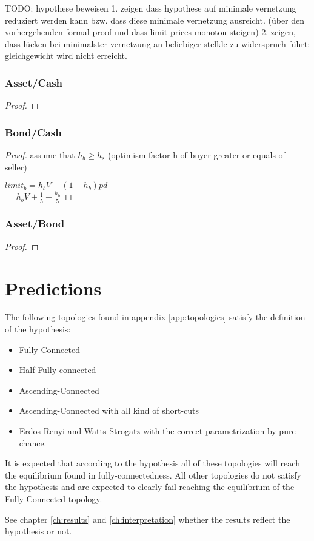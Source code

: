\documentclass[Bachelorarbeit.tex]{subfiles}
\begin{document}
TODO: hypothese beweisen
1. zeigen dass hypothese auf minimale vernetzung reduziert werden kann bzw. dass diese minimale vernetzung ausreicht. (über den vorhergehenden formal proof und dass limit-prices monoton steigen)
2. zeigen, dass lücken bei minimalster vernetzung an beliebiger stelkle zu widerspruch führt: gleichgewicht wird nicht erreicht. 


\subsubsection{Asset/Cash}
\begin{proof}
\end{proof}

\subsubsection{Bond/Cash}
\begin{proof}

assume that $h_b \geq h_s$ (optimism factor h of buyer greater or equals of seller)

$limit_b = h_b V + (1-h_b) pd$ \\
$= h_b V + \frac{1}{5} - \frac{h_b}{5}$
\end{proof}

\subsubsection{Asset/Bond}
\begin{proof}
\end{proof}

\section{Predictions}
The following topologies found in appendix \ref{app:topologies} satisfy the definition of the hypothesis:
 
\begin{itemize}
\item Fully-Connected
\item Half-Fully connected
\item Ascending-Connected
\item Ascending-Connected with all kind of short-cuts
\item Erdos-Renyi and Watts-Strogatz with the correct parametrization by pure chance.
\end{itemize}

It is expected that according to the hypothesis all of these topologies will reach the equilibrium found in fully-connectedness. All other topologies do not satisfy the hypothesis and are expected to clearly fail reaching the equilibrium of the Fully-Connected topology.

\medskip

See chapter \ref{ch:results} and \ref{ch:interpretation} whether the results reflect the hypothesis or not. 
\end{document}
